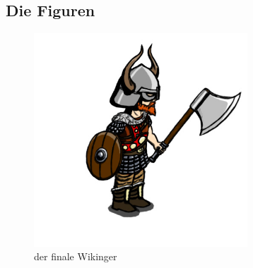 \documentclass[extern,palatino]{cgBA}
\begin{document}
\subsection{Die Figuren}
\begin{figure}
	\centering
	\includegraphics[height=8cm]{viking.jpg}
	\caption{der finale Wikinger}
	\label{viking}
\end{figure}
\end{document}
